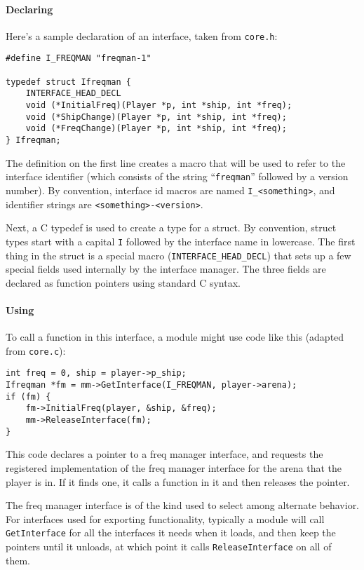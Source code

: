 \documentclass{article}
\begin{document}
\paragraph{Declaring}
Here's a sample declaration of an interface, taken from \verb/core.h/:

\begin{verbatim}
#define I_FREQMAN "freqman-1"

typedef struct Ifreqman {
    INTERFACE_HEAD_DECL
    void (*InitialFreq)(Player *p, int *ship, int *freq);
    void (*ShipChange)(Player *p, int *ship, int *freq);
    void (*FreqChange)(Player *p, int *ship, int *freq);
} Ifreqman;
\end{verbatim}

The definition on the first line creates a macro that will be used to
refer to the interface identifier (which consists of the string
``\verb/freqman/'' followed by a version number). By convention,
interface id macros are named \verb/I_<something>/, and identifier
strings are \verb/<something>-<version>/.

Next, a C typedef is used to create a type for a struct. By convention,
struct types start with a capital \verb/I/ followed by the interface
name in lowercase. The first thing in the struct is a special macro
(\verb/INTERFACE_HEAD_DECL/) that sets up a few special fields used
internally by the interface manager. The three fields are declared as
function pointers using standard C syntax.

\paragraph{Using}
To call a function in this interface, a module might use code like this
(adapted from \verb/core.c/):

\begin{verbatim}
int freq = 0, ship = player->p_ship;
Ifreqman *fm = mm->GetInterface(I_FREQMAN, player->arena);
if (fm) {
    fm->InitialFreq(player, &ship, &freq);
    mm->ReleaseInterface(fm);
}
\end{verbatim}

This code declares a pointer to a freq manager interface, and requests
the registered implementation of the freq manager interface for the
arena that the player is in. If it finds one, it calls a function in it
and then releases the pointer.

The freq manager interface is of the kind used to select among alternate
behavior. For interfaces used for exporting functionality, typically a
module will call \verb/GetInterface/ for all the interfaces it needs
when it loads, and then keep the pointers until it unloads, at which
point it calls \verb/ReleaseInterface/ on all of them.
\end{document}
